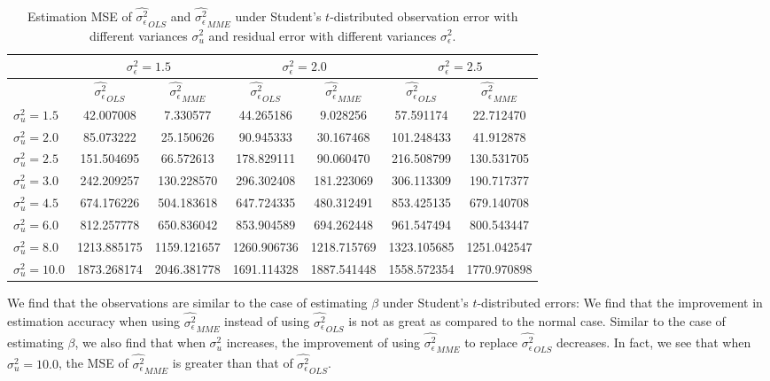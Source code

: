 \documentclass{article}
\begin{document}
\begin{table}[ht]
    \centering
    \caption{Estimation MSE of $\hat{\sigma^2_\epsilon}_{OLS}$ and $\hat{\sigma^2_\epsilon}_{MME}$ under Student's $t$-distributed observation error with different variances $\sigma^2_u$ and residual error with different variances $\sigma^2_\epsilon$.}
    \label{Tab:MSE_sigma_t}
    \begin{tabular}[t]{lcccccc}
        \hline
        &\multicolumn{2}{c}{$\sigma^2_\epsilon=1.5$}&\multicolumn{2}{c}{$\sigma^2_\epsilon=2.0$}&\multicolumn{2}{c}{$\sigma^2_\epsilon=2.5$}\\
        \hline
        &$\hat{\sigma^2_\epsilon}_{OLS}$&$\hat{\sigma^2_\epsilon}_{MME}$&$\hat{\sigma^2_\epsilon}_{OLS}$&
        $\hat{\sigma^2_\epsilon}_{MME}$&$\hat{\sigma^2_\epsilon}_{OLS}$&$\hat{\sigma^2_\epsilon}_{MME}$\\
        \hline
        $\sigma^2_u = 1.5$&42.007008&7.330577&44.265186&9.028256&57.591174&22.712470\\
        $\sigma^2_u = 2.0$&85.073222&25.150626&90.945333&30.167468&101.248433&41.912878\\
        $\sigma^2_u = 2.5$&151.504695&66.572613&178.829111&90.060470&216.508799&130.531705\\
        $\sigma^2_u = 3.0$&242.209257&130.228570&296.302408&181.223069&306.113309&190.717377\\
        $\sigma^2_u = 4.5$&674.176226&504.183618&647.724335&480.312491&853.425135&679.140708\\
        $\sigma^2_u = 6.0$&812.257778&650.836042&853.904589&694.262448&961.547494&800.543447\\
        $\sigma^2_u = 8.0$&1213.885175&1159.121657&1260.906736&1218.715769&1323.105685&1251.042547\\
        $\sigma^2_u = 10.0$&1873.268174&2046.381778&1691.114328&1887.541448&1558.572354&1770.970898\\
        \hline
    \end{tabular}
\end{table}

We find that the observations are similar to the case of estimating $\beta$ under Student's $t$-distributed errors: 
We find that the improvement in estimation accuracy when using $\hat{\sigma^2_\epsilon}_{MME}$ instead of using $\hat{\sigma^2_\epsilon}_{OLS}$ is not as great as compared to the normal case.
Similar to the case of estimating $\beta$, we also find that when $\sigma^2_u$ increases, the improvement of using $\hat{\sigma^2_\epsilon}_{MME}$ to replace $\hat{\sigma^2_\epsilon}_{OLS}$ decreases.
In fact, we see that when $\sigma^2_u = 10.0$, the MSE of $\hat{\sigma^2_\epsilon}_{MME}$ is greater than that of $\hat{\sigma^2_\epsilon}_{OLS}$. 
\end{document}

